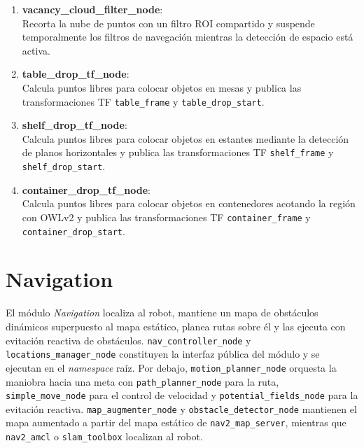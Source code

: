 \begin{enumerate}
    \item \textbf{vacancy\_cloud\_filter\_node}: \\
    Recorta la nube de puntos con un filtro ROI compartido y suspende temporalmente los filtros de navegación mientras la detección de espacio está activa.

    \item \textbf{table\_drop\_tf\_node}: \\
    Calcula puntos libres para colocar objetos en mesas y publica las transformaciones TF \texttt{table\_frame} y \texttt{table\_drop\_start}.

    \item \textbf{shelf\_drop\_tf\_node}: \\
    Calcula puntos libres para colocar objetos en estantes mediante la detección de planos horizontales y publica las transformaciones TF \texttt{shelf\_frame} y \texttt{shelf\_drop\_\allowbreak{}start}.

    \item \textbf{container\_drop\_tf\_node}: \\
    Calcula puntos libres para colocar objetos en contenedores acotando la región con OWLv2 y publica las transformaciones TF \texttt{container\_frame} y \texttt{container\_drop\_\allowbreak{}start}.
\end{enumerate}


\section[Navigation]{Navigation}
\label{app:justina_navigation}

El módulo \textit{Navigation} localiza al robot, mantiene un mapa de obstáculos dinámicos superpuesto al mapa estático, planea rutas sobre él y las ejecuta con evitación reactiva de obstáculos. \texttt{nav\_controller\_node} y \texttt{locations\_manager\_node} constituyen la interfaz pública del módulo y se ejecutan en el \textit{namespace} raíz. Por debajo, \texttt{motion\_planner\_node} orquesta la maniobra hacia una meta con \texttt{path\_planner\_node} para la ruta, \texttt{simple\_move\_node} para el control de velocidad y \texttt{potential\_fields\_node} para la evitación reactiva. \texttt{map\_augmenter\_node} y \texttt{obstacle\_detector\_node} mantienen el mapa aumentado a partir del mapa estático de \texttt{nav2\_map\_server}, mientras que \texttt{nav2\_amcl} o \texttt{slam\_toolbox} localizan al robot.

